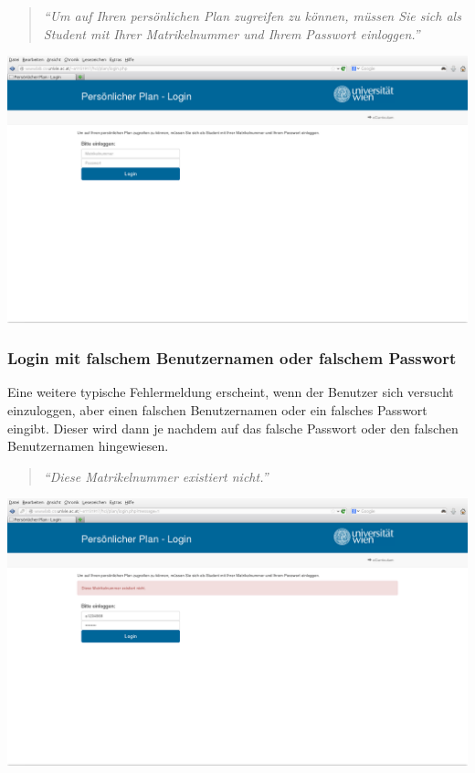 \documentclass[a4paper,10pt]{scrartcl}
\begin{document}
\begin{quote}
 \textit{``Um auf Ihren persönlichen Plan zugreifen zu können, müssen Sie sich als Student mit Ihrer Matrikelnummer und Ihrem Passwort einloggen.''}
\end{quote} 

\begin{center}
 \includegraphics[scale=0.4]{./fehlermeldung1.png}
\end{center}


\subsubsection*{Login mit falschem Benutzernamen oder falschem Passwort}

Eine weitere typische Fehlermeldung erscheint, wenn der Benutzer sich versucht einzuloggen, aber einen falschen Benutzernamen oder ein falsches Passwort eingibt.
Dieser wird dann je nachdem auf das falsche Passwort oder den falschen Benutzernamen hingewiesen.

\begin{quote}
 \textit{``Diese Matrikelnummer existiert nicht.''}
\end{quote} 

\begin{center}
 \includegraphics[scale=0.4]{./fehlermeldung2.png}
\end{center}
\end{document}
